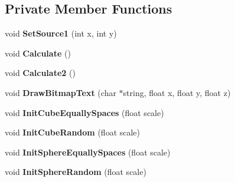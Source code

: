 \subsection*{Private Member Functions}
\begin{DoxyCompactItemize}
\item 
void {\bfseries Set\-Source1} (int x, int y)\label{classWaveRenderDemo_1_1Wave_a1b9d9afaf7f711e3e240da0e075fbcce}

\item 
void {\bfseries Calculate} ()\label{classWaveRenderDemo_1_1Wave_aa85f5dfb8a6f1f88ffa039ac0960e29f}

\item 
void {\bfseries Calculate2} ()\label{classWaveRenderDemo_1_1Wave_ae7983888d4f4003b79e94387125cd052}

\item 
void {\bfseries Draw\-Bitmap\-Text} (char $\ast$string, float x, float y, float z)\label{classWaveRenderDemo_1_1Wave_a7b884f8e769ad9d0d9c30e290bf7be8d}

\item 
void {\bfseries Init\-Cube\-Equally\-Spaces} (float scale)\label{classWaveRenderDemo_1_1Wave_ae40868d00c4a722a4d493597f3b5af56}

\item 
void {\bfseries Init\-Cube\-Random} (float scale)\label{classWaveRenderDemo_1_1Wave_aaf9c972cc37a89cb09a779b6366ea1b9}

\item 
void {\bfseries Init\-Sphere\-Equally\-Spaces} (float scale)\label{classWaveRenderDemo_1_1Wave_ac1e57ef127d53132bf2c920b8fe0f616}

\item 
void {\bfseries Init\-Sphere\-Random} (float scale)\label{classWaveRenderDemo_1_1Wave_a5e85157261cfeac89dec172c314af437}

\end{DoxyCompactItemize}
